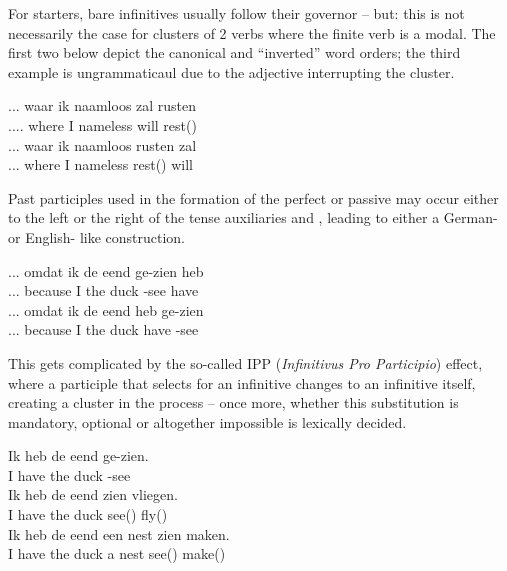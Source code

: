 For starters, bare infinitives usually follow their governor -- but: this is not necessarily the case for clusters of 2 verbs where the finite verb is a modal.
The first two  below depict the canonical and ``inverted'' word orders; the third example is ungrammaticaul due to the adjective  interrupting the cluster.
\begin{exe}
\ex\label{gloss:rusten_zal}
\begin{xlist}
\ex
\gll ... waar ik naamloos zal rusten\\
.... where I nameless will rest()\\
\ex
\gll ... waar ik naamloos rusten zal\\
... where I nameless rest() will\\
\end{xlist}
\end{exe}
Past participles used in the formation of the perfect or passive may occur either to the left or the right of the tense auxiliaries  and , leading to either a German- or English- like construction.
\begin{exe}
\ex\label{gloss:green_vs_red}
\begin{xlist}
\ex
\gll ... omdat ik de eend ge-zien heb\\
... because I the duck -see have\\
\ex
\gll ... omdat ik de eend heb ge-zien\\
... because I the duck have -see\\
\end{xlist}
\end{exe}
This gets complicated by the so-called IPP (\textit{Infinitivus Pro Participio}) effect, where a participle that selects for an infinitive changes to an infinitive itself, creating a cluster in the process -- once more, whether this substitution is mandatory, optional or altogether impossible is lexically decided.
\begin{exe}
\ex\label{gloss:ipp}
\begin{xlist}
\ex 
\gll Ik heb de eend ge-zien.\\
I have the duck -see\\
\ex
\gll Ik heb de eend zien vliegen.\\
I have the duck see() fly()\\
\ex\label{gloss:ipp_tv}
\gll Ik heb de eend een nest zien maken.\\
I have the duck a nest see() make()\\
\end{xlist}
\end{exe}
